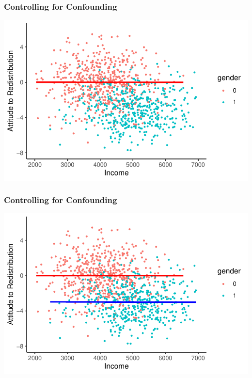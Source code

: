 \documentclass[xcolor=x11names,compress]{beamer}\usepackage[]{graphicx}\usepackage[]{color}
\makeatletter
\def\maxwidth{ %
  \ifdim\Gin@nat@width>\linewidth
    \linewidth
  \else
    \Gin@nat@width
  \fi
}
\newenvironment{knitrout}{}{} %
\renewcommand{\(}{\begin{columns}}
\renewcommand{\)}{\end{columns}}
\newcommand{\<}[1]{\begin{column}{#1}}
\renewcommand{\>}{\end{column}}
\makeatother
\begin{document}
\begin{frame}
\frametitle{Controlling for Confounding}
\begin{knitrout}
\color{fgcolor}
\includegraphics[width=\maxwidth]{figure/confound1a-1} 

\end{knitrout}
\end{frame}

\begin{frame}
\frametitle{Controlling for Confounding}
\begin{knitrout}
\color{fgcolor}
\includegraphics[width=\maxwidth]{figure/confound1b-1} 

\end{knitrout}
\end{frame}
\end{document}
